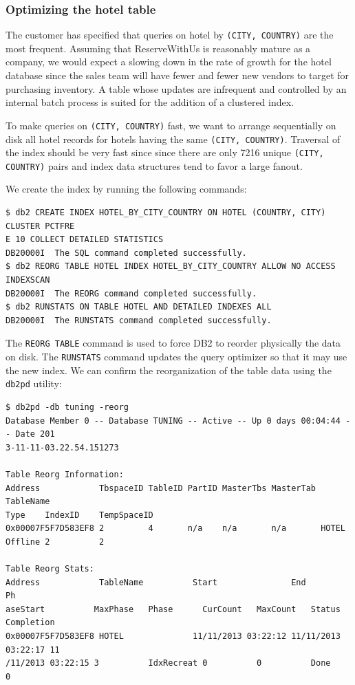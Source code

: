 \documentclass[letterpaper]{article}%
\begin{document}
\subsubsection{Optimizing the hotel table}

The customer has specified that queries on hotel by \texttt{(CITY, COUNTRY)}
are the most frequent. Assuming that ReserveWithUs is reasonably mature as a
company, we would expect a slowing down in the rate of growth for the hotel
database since the sales team will have fewer and fewer new vendors to target
for purchasing inventory. A table whose updates are infrequent and controlled
by an internal batch process is suited for the addition of a clustered index.

To make queries on \texttt{(CITY, COUNTRY)} fast, we want to arrange
sequentially on disk all hotel records for hotels having the same
\texttt{(CITY, COUNTRY)}. Traversal of the index should be very fast since
since there are only 7216 unique \texttt{(CITY, COUNTRY)} pairs and index data
structures tend to favor a large fanout.

We create the index by running the following commands:
\begin{Verbatim}
$ db2 CREATE INDEX HOTEL_BY_CITY_COUNTRY ON HOTEL (COUNTRY, CITY) CLUSTER PCTFRE
E 10 COLLECT DETAILED STATISTICS
DB20000I  The SQL command completed successfully.
$ db2 REORG TABLE HOTEL INDEX HOTEL_BY_CITY_COUNTRY ALLOW NO ACCESS INDEXSCAN
DB20000I  The REORG command completed successfully.
$ db2 RUNSTATS ON TABLE HOTEL AND DETAILED INDEXES ALL
DB20000I  The RUNSTATS command completed successfully.
\end{Verbatim}
The \texttt{REORG TABLE} command is used to force DB2 to reorder physically the
data on disk. The \texttt{RUNSTATS} command updates the query optimizer so that
it may use the new index. We can confirm the reorganization of the table data
using the \texttt{db2pd} utility:
\begin{Verbatim}
$ db2pd -db tuning -reorg
Database Member 0 -- Database TUNING -- Active -- Up 0 days 00:04:44 -- Date 201
3-11-11-03.22.54.151273

Table Reorg Information:
Address            TbspaceID TableID PartID MasterTbs MasterTab TableName       
Type    IndexID    TempSpaceID
0x00007F5F7D583EF8 2         4       n/a    n/a       n/a       HOTEL           
Offline 2          2

Table Reorg Stats:
Address            TableName          Start               End                 Ph
aseStart          MaxPhase   Phase      CurCount   MaxCount   Status  Completion
0x00007F5F7D583EF8 HOTEL              11/11/2013 03:22:12 11/11/2013 03:22:17 11
/11/2013 03:22:15 3          IdxRecreat 0          0          Done    0
\end{Verbatim}
\end{document}
